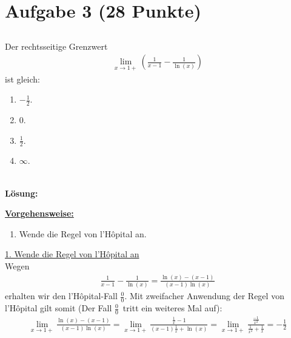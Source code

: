 \section*{Aufgabe 3 (28 Punkte)}
\vspace{0.4cm}
\subsection*{}
Der rechtsseitige Grenzwert
\begin{align*}
	\lim\limits_{x \to 1 +}
	\left(
	\frac{1}{x-1} - \frac{1}{\ln(x)}
	\right)
\end{align*}
ist gleich:
\renewcommand{\labelenumi}{(\alph{enumi})}
\begin{enumerate}
	\item 
	$ -\frac{1}{2}$.
	\item
	$ 0$.
	\item
	$ \frac{1}{2}$.
	\item
	$ \infty$.
\end{enumerate}
\ \\
\textbf{Lösung:}
\begin{mdframed}
\underline{\textbf{Vorgehensweise:}}
\renewcommand{\labelenumi}{\theenumi.}
\begin{enumerate}
\item Wende die Regel von l'H\^{o}pital an.
\end{enumerate}
\end{mdframed}

\underline{1. Wende die Regel von l'H\^{o}pital an}\\
Wegen 
\begin{align*}
	\frac{1}{x-1}
	- \frac{1}{\ln(x)}
	=
	\frac{\ln(x) - (x-1)}{(x-1) \ln (x)}
\end{align*}
erhalten wir den l'H\^{o}pital-Fall \glqq$ \frac{0}{0} $\grqq.
Mit zweifacher Anwendung der Regel von l'H\^{o}pital gilt somit (Der Fall \glqq$ \frac{0}{0} $\grqq~tritt ein weiteres Mal auf):
\begin{align*}
	\lim\limits_{x \to 1 +}
	\frac{\ln(x) - (x-1)}{(x-1) \ln (x)}
	=
	\lim\limits_{x \to 1 +}
	\frac{\frac{1}{x} - 1 }{(x-1) \frac{1}{x} + \ln(x)}
	=
	\lim\limits_{x \to 1 +}
	\frac{\frac{-1}{x^2} }{ \frac{1}{x^2} + \frac{1}{x}}
	=
	-
	\frac{1}{2}
\end{align*}

\newpage

